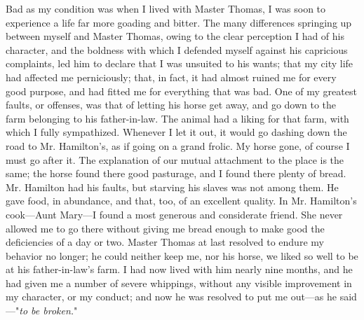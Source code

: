 Bad as my condition was when I lived with Master Thomas, I was soon to
experience a life far more goading and bitter. The many differences
springing up between myself and Master Thomas, owing to the clear
perception I had of his character, and the boldness with which I
defended myself against his capricious complaints, led him to declare
that I was unsuited to his wants; that my city life had affected me
perniciously; that, in fact, it had almost ruined me for every good
purpose, and had fitted me for everything that was bad. One of my
greatest faults, or offenses, was that of letting his horse get away,
and go down to the farm belonging to his father-in-law. The animal had a
liking for that farm, with which I fully sympathized. Whenever I let it
out, it would go dashing down the road to Mr. Hamilton's, as if going on
a grand frolic. My horse gone, of course I must go after it. The
explanation of our mutual attachment to the place is the same; the horse
found there good pasturage, and I found there plenty of bread. Mr.
Hamilton had his faults, but starving his slaves was not among them. He
gave food, in abundance, and that, too, of an excellent quality. In Mr.
Hamilton's cook---Aunt Mary---I found a most generous and considerate
friend. She never allowed me to go {\protect\hypertarget{203}{}{}}there
without giving me bread enough to make good the deficiencies of a day or
two. Master Thomas at last resolved to endure my behavior no longer; he
could neither keep me, nor his horse, we liked so well to be at his
father-in-law's farm. I had now lived with him nearly nine months, and
he had given me a number of severe whippings, without any visible
improvement in my character, or my conduct; and now he was resolved to
put me out---as he said---"\emph{to be broken.}"

